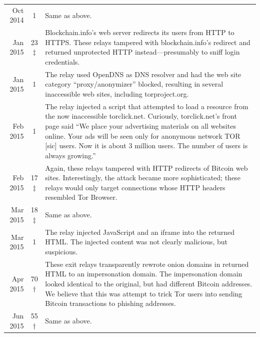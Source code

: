 \begin{table}
\begin{tabularx}{\textwidth}{r c X}
Oct 2014 & 1 & Same as above. \\

Jan 2015 & 23$\ddagger$ & Blockchain.info's web server redirects its
users from HTTP to HTTPS.  These relays tampered with blockchain.info's redirect
and returned unprotected HTTP instead---presumably to sniff login credentials. \\

Jan 2015 & 1 & The relay used OpenDNS as DNS resolver and had the web site
category ``proxy/anonymizer'' blocked, resulting in several inaccessible web
sites, including torproject.org. \\

Feb 2015 & 1 & The relay injected a script that attempted to load a resource
from the now inaccessible torclick.net.  Curiously, torclick.net's front page
said ``We place your advertising materials on all websites online.  Your ads
will be seen only for anonymous network TOR [sic] users.  Now it is about 3
million users. The number of users is always growing.'' \\

Feb 2015 & 17$\ddagger$ & Again, these relays tampered with HTTP redirects of
Bitcoin web sites.  Interestingly, the attack became more sophisticated; these
relays would only target connections whose HTTP headers resembled Tor Browser.
\\

Mar 2015 & 18$\ddagger$ & Same as above. \\

Mar 2015 & 1 & The relay injected JavaScript and an iframe into the returned
HTML.  The injected content was not clearly malicious, but suspicious. \\

Apr 2015 & 70$\dagger$ & These exit relays transparently rewrote onion domains
in returned HTML to an impersonation domain.  The impersonation domain looked
identical to the original, but had different Bitcoin addresses.  We believe that
this was attempt to trick Tor users into sending Bitcoin transactions to
phishing addresses. \\

Jun 2015 & 55$\dagger$ & Same as above. \\


\end{tabularx}
\end{table}
